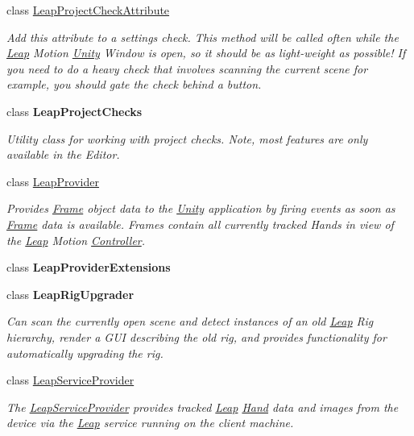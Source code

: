 \begin{DoxyCompactItemize}
class \mbox{\hyperlink{class_leap_1_1_unity_1_1_leap_project_check_attribute}{Leap\+Project\+Check\+Attribute}}
\begin{DoxyCompactList}\small\item\em Add this attribute to a settings check. This method will be called often while the \mbox{\hyperlink{namespace_leap_1_1_unity_1_1_leap}{Leap}} Motion \mbox{\hyperlink{namespace_leap_1_1_unity}{Unity}} Window is open, so it should be as light-\/weight as possible! If you need to do a heavy check that involves scanning the current scene for example, you should gate the check behind a button. \end{DoxyCompactList}\item 
class {\bfseries Leap\+Project\+Checks}
\begin{DoxyCompactList}\small\item\em Utility class for working with project checks. Note, most features are only available in the Editor. \end{DoxyCompactList}\item 
class \mbox{\hyperlink{class_leap_1_1_unity_1_1_leap_provider}{Leap\+Provider}}
\begin{DoxyCompactList}\small\item\em Provides \mbox{\hyperlink{class_leap_1_1_frame}{Frame}} object data to the \mbox{\hyperlink{namespace_leap_1_1_unity}{Unity}} application by firing events as soon as \mbox{\hyperlink{class_leap_1_1_frame}{Frame}} data is available. Frames contain all currently tracked Hands in view of the \mbox{\hyperlink{namespace_leap_1_1_unity_1_1_leap}{Leap}} Motion \mbox{\hyperlink{class_leap_1_1_controller}{Controller}}. \end{DoxyCompactList}\item 
class {\bfseries Leap\+Provider\+Extensions}
\item 
class {\bfseries Leap\+Rig\+Upgrader}
\begin{DoxyCompactList}\small\item\em Can scan the currently open scene and detect instances of an old \mbox{\hyperlink{namespace_leap_1_1_unity_1_1_leap}{Leap}} Rig hierarchy, render a G\+UI describing the old rig, and provides functionality for automatically upgrading the rig. \end{DoxyCompactList}\item 
class \mbox{\hyperlink{class_leap_1_1_unity_1_1_leap_service_provider}{Leap\+Service\+Provider}}
\begin{DoxyCompactList}\small\item\em The \mbox{\hyperlink{class_leap_1_1_unity_1_1_leap_service_provider}{Leap\+Service\+Provider}} provides tracked \mbox{\hyperlink{namespace_leap_1_1_unity_1_1_leap}{Leap}} \mbox{\hyperlink{class_leap_1_1_hand}{Hand}} data and images from the device via the \mbox{\hyperlink{namespace_leap_1_1_unity_1_1_leap}{Leap}} service running on the client machine. \end{DoxyCompactList}\item 

\end{DoxyCompactItemize}
